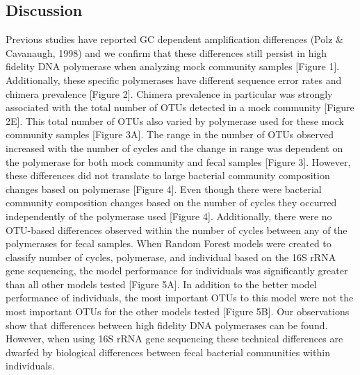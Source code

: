 \documentclass[11pt,]{article}
\begin{document}
\newpage

\subsection{Discussion}\label{discussion}

Previous studies have reported GC dependent amplification differences
(Polz \& Cavanaugh, 1998) and we confirm that these differences still
persist in high fidelity DNA polymerase when analyzing mock community
samples {[}Figure 1{]}. Additionally, these specific polymerases have
different sequence error rates and chimera prevalence {[}Figure 2{]}.
Chimera prevalence in particular was strongly associated with the total
number of OTUs detected in a mock community {[}Figure 2E{]}. This total
number of OTUs also varied by polymerase used for these mock community
samples {[}Figure 3A{]}. The range in the number of OTUs observed
increased with the number of cycles and the change in range was
dependent on the polymerase for both mock community and fecal samples
{[}Figure 3{]}. However, these differences did not translate to large
bacterial community composition changes based on polymerase {[}Figure
4{]}. Even though there were bacterial community composition changes
based on the number of cycles they occurred independently of the
polymerase used {[}Figure 4{]}. Additionally, there were no OTU-based
differences observed within the number of cycles between any of the
polymerases for fecal samples. When Random Forest models were created to
classify number of cycles, polymerase, and individual based on the 16S
rRNA gene sequencing, the model performance for individuals was
significantly greater than all other models tested {[}Figure 5A{]}. In
addition to the better model performance of individuals, the most
important OTUs to this model were not the most important OTUs for the
other models tested {[}Figure 5B{]}. Our observations show that
differences between high fidelity DNA polymerases can be found. However,
when using 16S rRNA gene sequencing these technical differences are
dwarfed by biological differences between fecal bacterial communities
within individuals.
\end{document}
